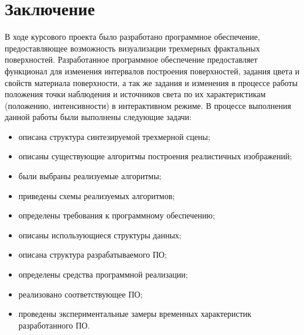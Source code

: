 \chapter*{Заключение}

В ходе курсового проекта было разработано программное обеспечение, предоставляющее возможность визуализации трехмерных фрактальных поверхностей. Разработанное программное обеспечение предоставляет функционал для изменения интервалов построения поверхностей, задания цвета и свойств материала поверхности, а так же задания и изменения в процессе работы положения точки наблюдения и источников света по их характеристикам (положению, интенсивности) в интерактивном режиме. В процессе выполнения данной работы были выполнены следующие задачи:

\begin{itemize}
    \item описана структура синтезируемой трехмерной сцены;
    \item описаны существующие алгоритмы построения реалистичных изображений;
    \item были выбраны реализуемые алгоритмы;
    \item приведены схемы реализуемых алгоритмов;
    \item определены требования к программному обеспечению;
	\item описаны использующиеся структуры данных;
	\item описана структура разрабатываемого ПО;
	\item определены средства программной реализации;
	\item реализовано соответствующее ПО;
	\item проведены экспериментальные замеры временных характеристик разработанного ПО.
\end{itemize}
